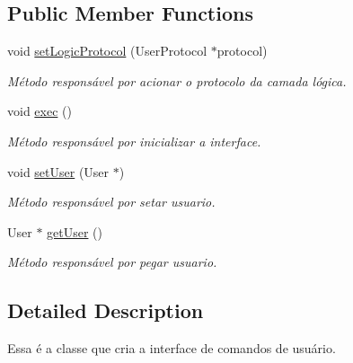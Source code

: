 \subsection*{Public Member Functions}
\begin{DoxyCompactItemize}
\item 
void \hyperlink{class_user_controler_a796395d8c5cbed232634e43748c64f66}{set\-Logic\-Protocol} (User\-Protocol $\ast$protocol)
\begin{DoxyCompactList}\small\item\em Método responsável por acionar o protocolo da camada lógica. \end{DoxyCompactList}\item 
\hypertarget{class_user_controler_a8d8c6485478ad73ed061f19446b3be68}{void \hyperlink{class_user_controler_a8d8c6485478ad73ed061f19446b3be68}{exec} ()}\label{class_user_controler_a8d8c6485478ad73ed061f19446b3be68}

\begin{DoxyCompactList}\small\item\em Método responsável por inicializar a interface. \end{DoxyCompactList}\item 
\hypertarget{class_user_controler_ae608d46a04a388d54f965dd5abdf61eb}{void \hyperlink{class_user_controler_ae608d46a04a388d54f965dd5abdf61eb}{set\-User} (User $\ast$)}\label{class_user_controler_ae608d46a04a388d54f965dd5abdf61eb}

\begin{DoxyCompactList}\small\item\em Método responsável por setar usuario. \end{DoxyCompactList}\item 
\hypertarget{class_user_controler_a414de6a522b2042e62cbcbba265e1f90}{User $\ast$ \hyperlink{class_user_controler_a414de6a522b2042e62cbcbba265e1f90}{get\-User} ()}\label{class_user_controler_a414de6a522b2042e62cbcbba265e1f90}

\begin{DoxyCompactList}\small\item\em Método responsável por pegar usuario. \end{DoxyCompactList}\end{DoxyCompactItemize}


\subsection{Detailed Description}
Essa é a classe que cria a interface de comandos de usuário. 

